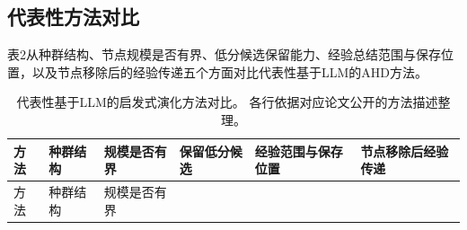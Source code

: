 \documentclass{article}
\begin{document}
\subsection{代表性方法对比}\label{ux4ee3ux8868ux6027ux65b9ux6cd5ux5bf9ux6bd4}

表2从种群结构、节点规模是否有界、低分候选保留能力、经验总结范围与保存位置，以及节点移除后的经验传递五个方面对比代表性基于LLM的AHD方法。

\begin{longtable}[]{@{}
  >{\raggedright\arraybackslash}p{}
  >{\raggedright\arraybackslash}p{}
  >{\raggedright\arraybackslash}p{}
  >{\raggedright\arraybackslash}p{}
  >{\raggedright\arraybackslash}p{}
  >{\raggedright\arraybackslash}p{}@{}}
\caption{代表性基于LLM的启发式演化方法对比。 各行依据对应论文公开的方法描述整理。}\tabularnewline
\toprule\noalign{}
\begin{minipage}[b]{\linewidth}\raggedright
方法
\end{minipage} & \begin{minipage}[b]{\linewidth}\raggedright
种群结构
\end{minipage} & \begin{minipage}[b]{\linewidth}\raggedright
规模是否有界
\end{minipage} & \begin{minipage}[b]{\linewidth}\raggedright
保留低分候选
\end{minipage} & \begin{minipage}[b]{\linewidth}\raggedright
经验范围与保存位置
\end{minipage} & \begin{minipage}[b]{\linewidth}\raggedright
节点移除后经验传递
\end{minipage} \\
\midrule\noalign{}
\endfirsthead
\toprule\noalign{}
\begin{minipage}[b]{\linewidth}\raggedright
方法
\end{minipage} & \begin{minipage}[b]{\linewidth}\raggedright
种群结构
\end{minipage} & \begin{minipage}[b]{\linewidth}\raggedright
规模是否有界
\end{minipage} & \begin{minipage}[b]{\linewidth}\raggedright

\end{minipage}
\end{longtable}
\end{document}
